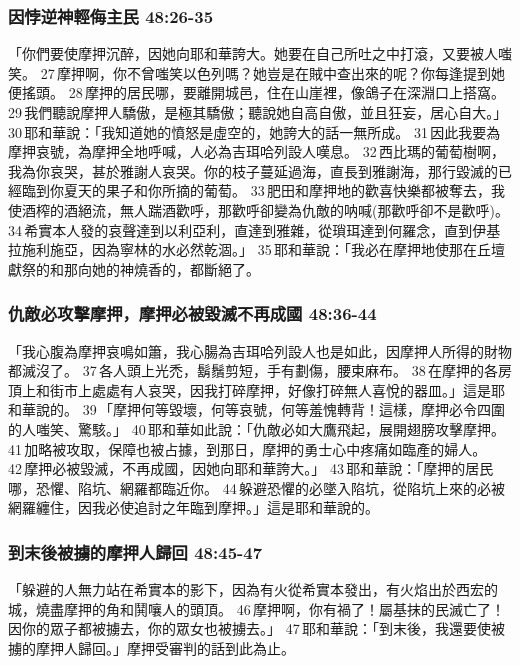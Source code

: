 \subsubsection{因悖逆神輕侮主民 48:26-35}
「你們要使摩押沉醉，因她向耶和華誇大。她要在自己所吐之中打滾，又要被人嗤笑。 27 摩押啊，你不曾嗤笑以色列嗎？她豈是在賊中查出來的呢？你每逢提到她便搖頭。 28 摩押的居民哪，要離開城邑，住在山崖裡，像鴿子在深淵口上搭窩。 29 我們聽說摩押人驕傲，是極其驕傲；聽說她自高自傲，並且狂妄，居心自大。」 30 耶和華說：「我知道她的憤怒是虛空的，她誇大的話一無所成。 31 因此我要為摩押哀號，為摩押全地呼喊，人必為吉珥哈列設人嘆息。 32 西比瑪的葡萄樹啊，我為你哀哭，甚於雅謝人哀哭。你的枝子蔓延過海，直長到雅謝海，那行毀滅的已經臨到你夏天的果子和你所摘的葡萄。 33 肥田和摩押地的歡喜快樂都被奪去，我使酒榨的酒絕流，無人踹酒歡呼，那歡呼卻變為仇敵的呐喊(那歡呼卻不是歡呼)。 34 希實本人發的哀聲達到以利亞利，直達到雅雜，從瑣珥達到何羅念，直到伊基拉施利施亞，因為寧林的水必然乾涸。」 35 耶和華說：「我必在摩押地使那在丘壇獻祭的和那向她的神燒香的，都斷絕了。

\subsubsection{仇敵必攻擊摩押，摩押必被毀滅不再成國 48:36-44}
「我心腹為摩押哀鳴如簫，我心腸為吉珥哈列設人也是如此，因摩押人所得的財物都滅沒了。 37 各人頭上光禿，鬍鬚剪短，手有劃傷，腰束麻布。 38 在摩押的各房頂上和街市上處處有人哀哭，因我打碎摩押，好像打碎無人喜悅的器皿。」這是耶和華說的。 39 「摩押何等毀壞，何等哀號，何等羞愧轉背！這樣，摩押必令四圍的人嗤笑、驚駭。」 40 耶和華如此說：「仇敵必如大鷹飛起，展開翅膀攻擊摩押。 41 加略被攻取，保障也被占據，到那日，摩押的勇士心中疼痛如臨產的婦人。 42 摩押必被毀滅，不再成國，因她向耶和華誇大。」 43 耶和華說：「摩押的居民哪，恐懼、陷坑、網羅都臨近你。 44 躲避恐懼的必墜入陷坑，從陷坑上來的必被網羅纏住，因我必使追討之年臨到摩押。」這是耶和華說的。

\subsubsection{到末後被擄的摩押人歸回 48:45-47}
「躲避的人無力站在希實本的影下，因為有火從希實本發出，有火焰出於西宏的城，燒盡摩押的角和鬨嚷人的頭頂。 46 摩押啊，你有禍了！屬基抹的民滅亡了！因你的眾子都被擄去，你的眾女也被擄去。」 47 耶和華說：「到末後，我還要使被擄的摩押人歸回。」摩押受審判的話到此為止。

